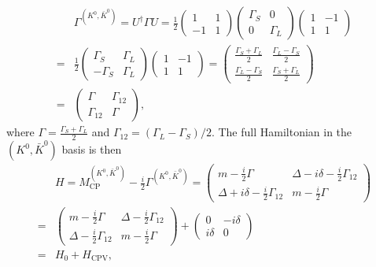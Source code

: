 \begin{align}
    &\Gamma^{(K^0, \bar{K}^0)} = U^\dagger \Gamma U = \frac{1}{2}\begin{pmatrix}
    1 & 1 \\
    -1 & 1
    \end{pmatrix} \begin{pmatrix}
    \Gamma_S & 0 \\
    0 & \Gamma_L
    \end{pmatrix} \begin{pmatrix}
    1 & -1 \\
    1 & 1
     \end{pmatrix}\\
    =& \frac{1}{2}\begin{pmatrix}
        \Gamma_S & \Gamma_L \\
        -\Gamma_S & \Gamma_L
    \end{pmatrix} 
    \begin{pmatrix}
    1 & -1 \\
    1 & 1
     \end{pmatrix}
    = \begin{pmatrix}
    \frac{\Gamma_S + \Gamma_L}{2} & \frac{\Gamma_L - \Gamma_S}{2} \\
    \frac{\Gamma_L - \Gamma_S}{2} & \frac{\Gamma_S + \Gamma_L}{2}
    \end{pmatrix}\\
    =& \begin{pmatrix}
    \Gamma & \Gamma_{12} \\
    \Gamma_{12} & \Gamma
    \end{pmatrix},
\end{align}
where $\Gamma = \frac{\Gamma_S + \Gamma_L}{2}$ and $\Gamma_{12} = (\Gamma_L - \Gamma_S)/2$. The full Hamiltonian in the $(K^0, \bar{K}^0)$ basis is then 
\begin{align}
    &H = M_{\text{CP}}^{(K^0, \bar{K}^0)} - \frac{i}{2}\Gamma^{(K^0, \bar{K}^0)} = \begin{pmatrix}
    m - \frac{i}{2}\Gamma & \Delta - i\delta - \frac{i}{2}\Gamma_{12} \\
    \Delta + i\delta - \frac{i}{2}\Gamma_{12} & m - \frac{i}{2}\Gamma
    \end{pmatrix}\\
    =& \begin{pmatrix}
        m-\frac{i}{2}\Gamma &\Delta - \frac{i}{2}\Gamma_{12} \\
        \Delta - \frac{i}{2}\Gamma_{12} & m-\frac{i}{2}\Gamma 
    \end{pmatrix}
    + \begin{pmatrix}
        0 & -i\delta \\
        i\delta & 0
    \end{pmatrix}\\
    =& H_0 + H_{\text{CPV}},
\end{align} 

